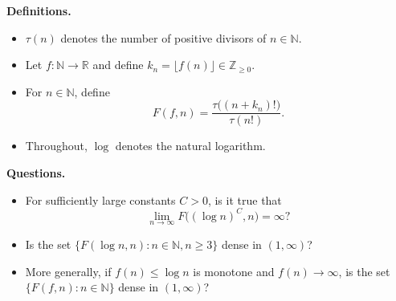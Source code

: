 \textbf{Definitions.}
\begin{itemize}
\item $\tau(n)$ denotes the number of positive divisors of $n\in\mathbb{N}$.
\item Let $f:\mathbb{N}\to\mathbb{R}$ and define $k_n=\lfloor f(n)\rfloor\in\mathbb{Z}_{\ge 0}$.
\item For $n\in\mathbb{N}$, define
\[
F(f,n)=\frac{\tau\big((n+k_n)!\big)}{\tau(n!)}.
\]
\item Throughout, $\log$ denotes the natural logarithm.
\end{itemize}

\textbf{Questions.}
\begin{itemize}
\item[(Q1)] For sufficiently large constants $C>0$, is it true that
\[
\lim_{n\to\infty} F\big((\log n)^C,n\big)=\infty?
\]
\item[(Q2)] Is the set $\{F(\log n,n): n\in\mathbb{N}, n\ge 3\}$ dense in $(1,\infty)$?
\item[(Q3)] More generally, if $f(n)\le \log n$ is monotone and $f(n)\to\infty$, is the set $\{F(f,n):n\in\mathbb{N}\}$ dense in $(1,\infty)$?
\end{itemize}

